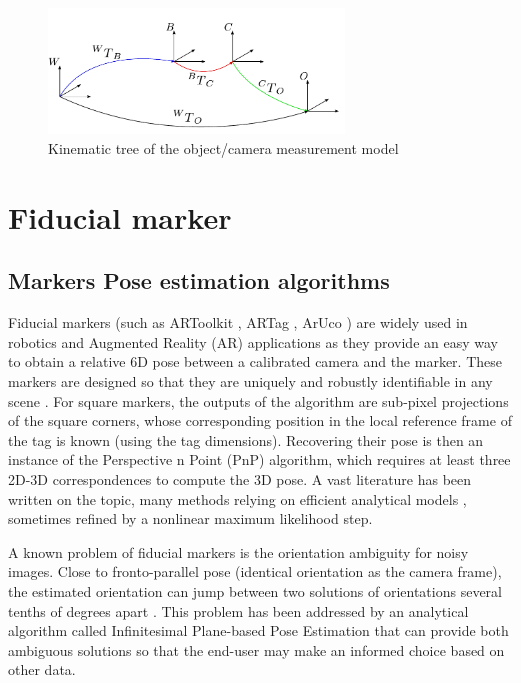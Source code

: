 \begin{figure}
    \centering
    \includegraphics[width=0.7\textwidth]{figures/kin_tree_object.pdf}
    \caption{Kinematic tree of the object/camera measurement model}
    \label{fig:camera_object_chain}
\end{figure}


%
%
\section{Fiducial marker}
\subsection{Markers Pose estimation algorithms}

Fiducial markers (such as ARToolkit \cite{kato1999marker}, ARTag \cite{fiala2005artag}, ArUco \cite{garrido2014automatic}) are widely used in robotics and Augmented Reality (AR) applications as they provide an easy way to obtain a relative 6D pose 
between a calibrated camera and the marker. These markers are designed so that they are uniquely and robustly identifiable in any scene 
\cite{wang2016iros,romero2018speeded}. For square markers, the outputs of the algorithm are sub-pixel projections of the square corners, whose 
corresponding position in the local reference frame of the tag is known (using the tag dimensions). Recovering their pose is then an instance 
of the Perspective n Point (PnP) algorithm, which requires at least three 2D-3D correspondences to compute the 3D pose. 
A vast literature has been written on the topic, many methods relying on efficient analytical models
\cite{gao2003complete, lepetit2009epnp, collins2014infinitesimal, terzakis2020consistently}, sometimes refined by a nonlinear maximum likelihood step. 

A known problem of fiducial markers is the orientation ambiguity for noisy images. Close to fronto-parallel pose (identical orientation as 
the camera frame), the estimated orientation can jump between two solutions of orientations several tenths of degrees apart 
\cite{collins2014infinitesimal}. 
This problem has been addressed by an analytical algorithm called Infinitesimal Plane-based Pose Estimation \cite{collins2014infinitesimal} that can 
provide both ambiguous solutions so that the end-user may make an informed choice based on other data.

